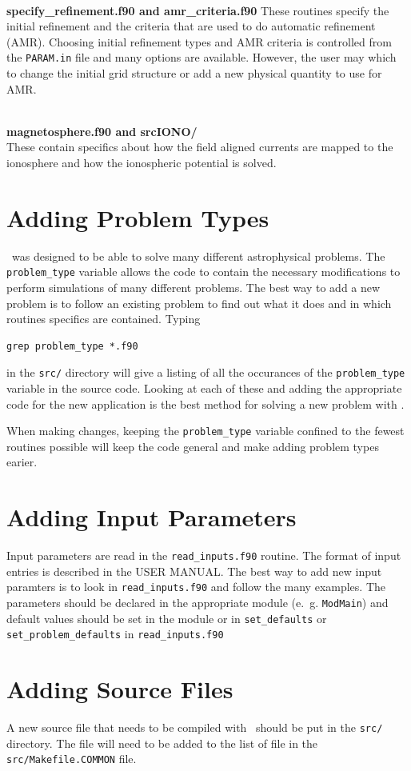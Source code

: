 \ \ \\
{\bf specify\_refinement.f90 and amr\_criteria.f90}
These routines specify the initial refinement and the criteria that are
used to do automatic refinement (AMR).  Choosing initial refinement 
types and AMR criteria is
controlled from the {\tt PARAM.in} file and many options are available.
However, the user may which to change the initial grid structure or
add a new physical quantity to use for AMR.

\ \ \\
{\bf magnetosphere.f90 and srcIONO/} \\
These contain specifics about how the field aligned currents are mapped to the 
ionosphere and how the ionospheric potential is solved.


\section{Adding Problem Types \label{section:problem_type}}

\BATSRUS\ was designed to be able to solve many different astrophysical problems.
The {\tt problem\_type} variable allows the code to contain the necessary 
modifications to perform simulations of many different problems.
The best way to add a new problem is to follow an existing problem to find out
what it does and in which routines specifics are contained.
Typing
\begin{verbatim}
grep problem_type *.f90 
\end{verbatim}
in the {\tt src/} directory will give a listing of all the occurances of the 
{\tt problem\_type} variable in the source code.  Looking at each of these
and adding the appropriate code for the new application is the best method
for solving a new problem with \BATSRUS.

When making changes, keeping the {\tt problem\_type} variable confined to 
the fewest routines possible will keep the code general and make adding problem
types earier.

\section{Adding Input Parameters \label{section:adding_input}}

Input parameters are read in the {\tt read\_inputs.f90} routine.  The format of
input entries is described in the USER MANUAL.  The best
way to add new input paramters is to look in {\tt read\_inputs.f90} and follow the many
examples.  The parameters should be declared in the appropriate module 
(e.~g. {\tt ModMain}) and default values should be set in the module or in 
{\tt set\_defaults} or {\tt set\_problem\_defaults} in {\tt read\_inputs.f90}

\section{Adding Source Files \label{section:adding_files}}

A new source file that needs to be compiled with \BATSRUS\ should be
put in the {\tt src/} directory.  The file will need to be added to the
list of file in the {\tt src/Makefile.COMMON} file.








